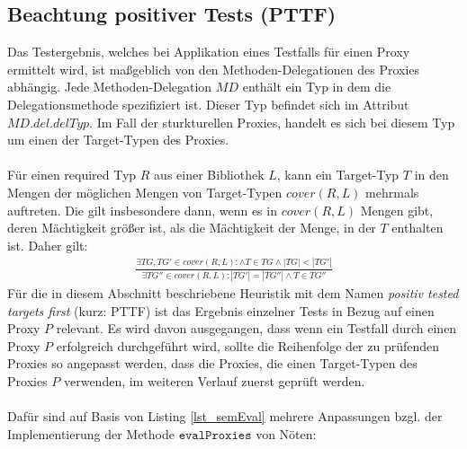 \subsection{Beachtung positiver Tests (PTTF)}\label{sec_pttf}
Das Testergebnis, welches bei Applikation eines Testfalls für einen Proxy ermittelt wird, ist maßgeblich von den Methoden-Delegationen des Proxies abhängig. Jede Methoden-Delegation $\mathit{MD}$ enthält ein Typ in dem die Delegationsmethode spezifiziert ist. Dieser Typ befindet sich im Attribut $\mathit{MD.del.delTyp}$. Im Fall der sturkturellen Proxies, handelt es sich bei diesem Typ um einen der Target-Typen des Proxies.\\\\
Für einen required Typ $R$ aus einer Bibliothek $L$, kann ein Target-Typ $T$ in den Mengen der möglichen Mengen von Target-Typen $\mathit{cover(R,L)}$ mehrmals auftreten. Die gilt insbesondere dann, wenn es in $\mathit{cover(R,L)}$ Mengen gibt, deren Mächtigkeit größer ist, als die Mächtigkeit der Menge, in der $T$ enthalten ist. Daher gilt:
\begin{gather*}
\frac{\exists \mathit{TG},\mathit{TG'} \in \mathit{cover(R,L)} : \wedge T \in \mathit{TG} \wedge |\mathit{TG}| < |\mathit{TG'}|}{\exists \mathit{TG''} \in \mathit{cover(R,L)} : |\mathit{TG'}| = |\mathit{TG''}| \wedge T \in \mathit{TG''}}
\end{gather*}
\noindent
Für die in diesem Abschnitt beschriebene Heuristik mit dem Namen \emph{positiv tested targets first} (kurz: PTTF) ist das Ergebnis einzelner Tests in Bezug auf einen Proxy $P$ relevant. Es wird davon ausgegangen, dass wenn ein Testfall durch einen Proxy $P$ erfolgreich durchgeführt wird, sollte die Reihenfolge der zu prüfenden Proxies so angepasst werden, dass die Proxies, die einen Target-Typen des Proxies $P$ verwenden, im weiteren Verlauf zuerst geprüft werden.
\\\\
Dafür sind auf Basis von Listing \ref{lst_semEval} mehrere Anpassungen bzgl. der Implementierung der Methode $\texttt{evalProxies}$ von Nöten:
